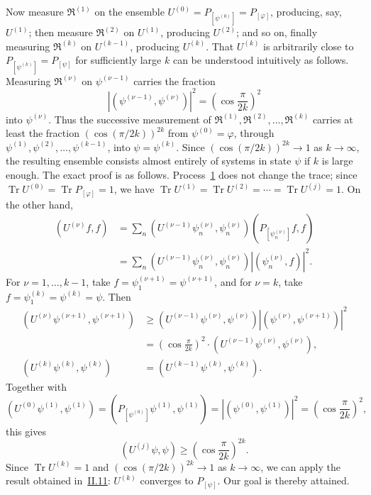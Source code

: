 \documentclass[fontsize=13pt,twoside,openany,headings=normal,parskip=false,bookmarkpackage=false,DIV=calc]{scrbook}
\begin{document}
Now measure $\mathfrak R^{(1)}$ on the ensemble $U^{(0)}=P_{[\psi^{(0)}]}=P_{[\varphi]}$, producing, say, $U^{(1)}$; then measure $\mathfrak R^{(2)}$ on $U^{(1)}$, producing $U^{(2)}$; and so on, finally measuring $\mathfrak R^{(k)}$ on $U^{(k-1)}$, producing $U^{(k)}$. That $U^{(k)}$ is arbitrarily close to $P_{[\psi^{(k)}]}=P_{[\psi]}$ for sufficiently large $k$ can be understood intuitively as follows. Measuring $\mathfrak R^{(\nu)}$ on $\psi^{(\nu-1)}$ carries the fraction
\[
|(\psi^{(\nu-1)},\psi^{(\nu)})|^2=\left(\cos\frac\pi{2k}\right)^2
\]
into $\psi^{(\nu)}$. Thus the successive measurement of $\mathfrak R^{(1)},\mathfrak R^{(2)},\ldots,\mathfrak R^{(k)}$ carries at least the fraction $(\cos(\pi/2k))^{2k}$ from $\psi^{(0)}=\varphi$, through $\psi^{(1)},\psi^{(2)},\ldots,\psi^{(k-1)}$, into $\psi=\psi^{(k)}$. Since $(\cos(\pi/2k))^{2k}\to1$ as $k\to\infty$, the resulting ensemble consists almost entirely of systems in state $\psi$ if $k$ is large enough. The exact proof is as follows. Process~\hyperref[eq:V.1.1]{1} does not change the trace; since $\operatorname{Tr}U^{(0)}=\operatorname{Tr}P_{[\varphi]}=1$, we have $\operatorname{Tr}U^{(1)}=\operatorname{Tr}U^{(2)}=\cdots=\operatorname{Tr}U^{(j)}=1$. On the other hand,
\begin{align*}
(U^{(\nu)}f,f)
&=\sum_n(U^{(\nu-1)}\psi_n^{(\nu)},\psi_n^{(\nu)})(P_{[\psi_n^{(\nu)}]}f,f)\\
&=\sum_n(U^{(\nu-1)}\psi_n^{(\nu)},\psi_n^{(\nu)})|(\psi_n^{(\nu)},f)|^2.
\end{align*}
For $\nu=1,\ldots,k-1$, take $f=\psi_1^{(\nu+1)}=\psi^{(\nu+1)}$, and for $\nu=k$, take $f=\psi_1^{(k)}=\psi^{(k)}=\psi$. Then
\begin{align*}
(U^{(\nu)}\psi^{(\nu+1)},\psi^{(\nu+1)})
&\geq(U^{(\nu-1)}\psi^{(\nu)},\psi^{(\nu)})|(\psi^{(\nu)},\psi^{(\nu+1)})|^2\\
&=\left(\cos\frac\pi{2k}\right)^2\cdot(U^{(\nu-1)}\psi^{(\nu)},\psi^{(\nu)}),\\
(U^{(k)}\psi^{(k)},\psi^{(k)})&=(U^{(k-1)}\psi^{(k)},\psi^{(k)}).
\end{align*}
\hypertarget{origpage-196}{}%
Together with
\[
(U^{(0)}\psi^{(1)},\psi^{(1)})=(P_{[\psi^{(0)}]}\psi^{(1)},\psi^{(1)})
=|(\psi^{(0)},\psi^{(1)})|^2=\left(\cos\frac\pi{2k}\right)^2,
\]
this gives
\[
(U^{(j)}\psi,\psi)\geq\left(\cos\frac\pi{2k}\right)^{2k}.
\]
Since $\operatorname{Tr}U^{(k)}=1$ and $(\cos(\pi/2k))^{2k}\to1$ as $k\to\infty$, we can apply the result obtained in~\hyperref[sec:II.11]{II.11}: $U^{(k)}$ converges to $P_{[\psi]}$. Our goal is thereby attained.
\end{document}
